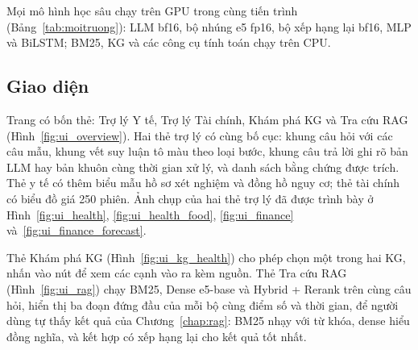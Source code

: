 Mọi mô hình học sâu chạy trên GPU trong cùng tiến trình (Bảng~\ref{tab:moitruong}): LLM bf16, bộ nhúng e5 fp16, bộ
xếp hạng lại bf16, MLP và BiLSTM; BM25, KG và các công cụ tính toán chạy trên CPU.



\subsection{Giao diện}
Trang có bốn thẻ: Trợ lý Y tế, Trợ lý Tài chính, Khám phá KG và Tra cứu RAG (Hình~\ref{fig:ui_overview}). Hai thẻ
trợ lý có cùng bố cục: khung câu hỏi với các câu mẫu, khung vết suy luận tô màu theo loại bước, khung câu trả lời
ghi rõ bản LLM hay bản khuôn cùng thời gian xử lý, và danh sách bằng chứng được trích. Thẻ y tế có thêm biểu mẫu hồ sơ
xét nghiệm và đồng hồ nguy cơ; thẻ tài chính có biểu đồ giá 250 phiên. Ảnh chụp của hai thẻ trợ lý đã được trình bày
ở Hình~\ref{fig:ui_health}, \ref{fig:ui_health_food}, \ref{fig:ui_finance} và~\ref{fig:ui_finance_forecast}.


Thẻ Khám phá KG (Hình~\ref{fig:ui_kg_health}) cho phép chọn một trong hai KG, nhấn vào nút để xem các cạnh vào ra
kèm nguồn. Thẻ Tra cứu RAG (Hình~\ref{fig:ui_rag}) chạy BM25, Dense e5-base và Hybrid + Rerank trên cùng câu hỏi,
hiển thị ba đoạn đứng đầu của mỗi bộ cùng điểm số và thời gian, để người dùng tự thấy kết quả của
Chương~\ref{chap:rag}: BM25 nhạy với từ khóa, dense hiểu đồng nghĩa, và kết hợp có xếp hạng lại cho kết quả tốt
nhất.



